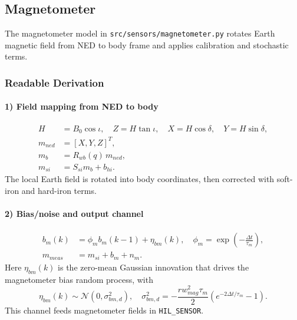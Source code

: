 \documentclass[11pt,a4paper]{article}
\begin{document}
\subsection{Magnetometer}
The magnetometer model in \texttt{src/sensors/magnetometer.py} rotates Earth magnetic field from NED to body frame and applies calibration and stochastic terms.

\subsubsection*{Readable Derivation}
\paragraph{1) Field mapping from NED to body}
\begin{align}
H &= B_0\cos\iota, \quad Z=H\tan\iota, \quad X=H\cos\delta, \quad Y=H\sin\delta, \\
m_{ned} &= [X,Y,Z]^T, \\
m_b &= R_{wb}(q)\,m_{ned}, \\
m_{si} &= S_{si}m_b + b_{hi}.
\end{align}
The local Earth field is rotated into body coordinates, then corrected with soft-iron and hard-iron terms.

\paragraph{2) Bias/noise and output channel}
\begin{align}
b_m(k) &= \phi_m b_m(k-1)+\eta_{bm}(k), \quad \phi_m=\exp\left(-\frac{\Delta t}{\tau_m}\right), \\
m_{meas} &= m_{si}+b_m+n_m.
\end{align}
Here $\eta_{bm}(k)$ is the zero-mean Gaussian innovation that drives the magnetometer bias random process, with
\begin{equation}
\eta_{bm}(k)\sim\mathcal{N}(0,\sigma_{bm,d}^2),\quad
\sigma_{bm,d}^2=-\frac{rw_{mag}^2\tau_m}{2}\left(e^{-2\Delta t/\tau_m}-1\right).
\end{equation}
This channel feeds magnetometer fields in \texttt{HIL\_SENSOR}.
\end{document}
